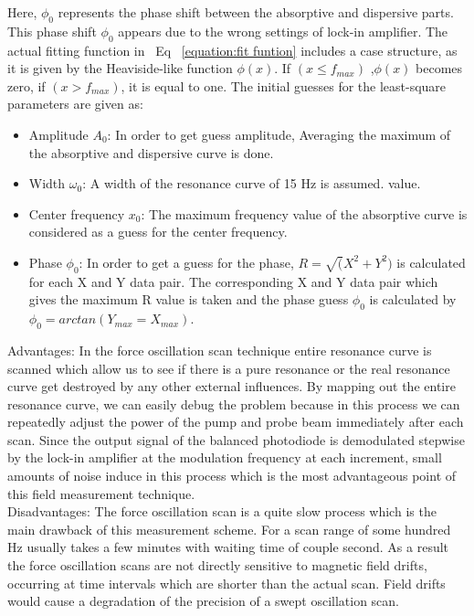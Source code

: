 Here, $\phi_0 $ represents the phase shift between the absorptive and dispersive parts. This phase shift $\phi_0$ appears due to the wrong settings of lock-in amplifier. The actual fitting function in~ Eq~ \ref{equation:fit funtion} includes a case
structure, as it is given by the Heaviside-like function $\phi(x)$. If $ (x \leq f_{max}) $ ,$\phi(x)$ becomes zero,
if $(x > f_{max})$, it is equal to one. The initial guesses for the least-square parameters are given
as:\\
\begin{itemize}
\item
Amplitude $A_0$: In order to get guess amplitude, Averaging the maximum of the absorptive and dispersive curve is done.
\item
Width $\omega_0$: A width of the resonance curve of 15 Hz is assumed.
value.
\item
Center frequency $x_0$: The maximum frequency value of the
absorptive curve is considered as a guess for the center frequency.
\item
Phase $\phi_0$: In order to get a guess for the phase, $ R =\sqrt (
X^2 + Y ^2)$ is calculated for each
X and Y data pair. The corresponding X and Y data pair which gives the maximum
R value is taken and the phase guess $\phi _0$  is calculated by $\phi _0 = arctan(Y_{max}=X_{max})$.
\end{itemize}
Advantages: In the force oscillation scan technique entire resonance curve is scanned which allow us to see if there is a pure resonance or the real resonance curve get destroyed by any other external influences. By mapping out the entire resonance curve, we can easily debug the problem because in this process we can repeatedly adjust the power of the pump and probe beam immediately after each scan. Since the output signal of the balanced photodiode is demodulated stepwise by the lock-in amplifier at the modulation frequency at each increment, small amounts of noise induce in this process which is the most advantageous point of this field measurement technique. \\
Disadvantages: The force oscillation scan is a quite slow process which is the main drawback of this measurement scheme.
For a scan range of some hundred Hz usually takes a few minutes with  waiting time of couple second. As a result the force oscillation scans are not directly sensitive to magnetic field drifts, occurring at time intervals which are shorter than the actual scan. Field drifts would cause a degradation of the precision of a swept oscillation scan.

